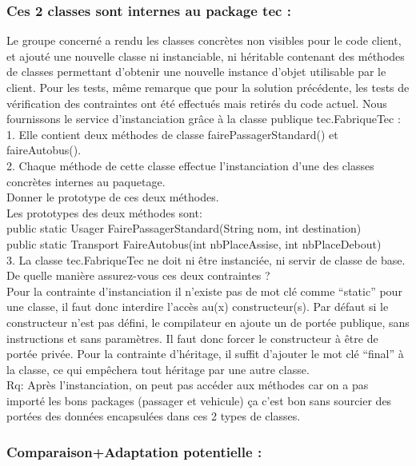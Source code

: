 \documentclass{article}
\begin{document}
\subsubsection{Ces 2 classes sont internes au package tec : }
Le groupe concerné a rendu les classes concrètes non visibles pour le code client, et ajouté une nouvelle classe ni instanciable, ni héritable contenant des méthodes de classes permettant d’obtenir une nouvelle instance d’objet utilisable par le client.
Pour les tests, même remarque que pour la solution précédente, les tests de vérification des contraintes ont été effectués mais retirés du code actuel.
Nous fournissons le service d’instanciation grâce à la classe publique tec.FabriqueTec :\\
1. Elle contient deux méthodes de classe fairePassagerStandard() et faireAutobus().\\
2. Chaque méthode de cette classe effectue l’instanciation d’une des classes concrètes
internes au paquetage.\\
Donner le prototype de ces deux méthodes.\\
Les prototypes des deux méthodes sont:\\
public static Usager FairePassagerStandard(String nom, int destination)\\
public static Transport FaireAutobus(int nbPlaceAssise, int nbPlaceDebout)\\
3. La classe tec.FabriqueTec ne doit ni être instanciée, ni servir de classe de base.\\
De quelle manière assurez-vous ces deux contraintes ?\\
Pour la contrainte d’instanciation il n’existe pas de mot clé comme “static” pour une classe, il faut donc interdire l'accès au(x) constructeur(s). Par défaut si le constructeur n'est pas défini, le compilateur en ajoute un de portée publique, sans instructions et sans paramètres. Il faut donc forcer le constructeur à être de portée privée. Pour la contrainte d’héritage, il suffit d’ajouter le mot clé “final” à la classe, ce qui empêchera tout héritage par une autre classe.\\
Rq: Après l'instanciation, on peut pas accéder aux méthodes car on a pas importé les bons packages (passager et vehicule) ça c'est bon sans sourcier des portées des données encapsulées dans ces 2 types de classes.\newline
\subsubsection{Comparaison+Adaptation potentielle : }
\end{document}

